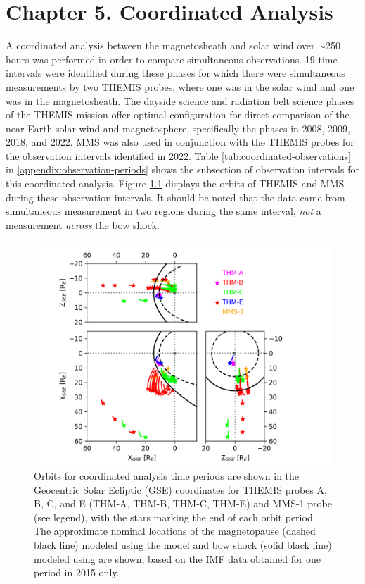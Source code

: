 \chapter{Chapter 5. Coordinated Analysis}
A coordinated analysis between the magnetosheath and solar wind over $\sim$250 hours was performed in order to compare simultaneous observations. 19 time intervals were identified during these phases for which there were simultaneous measurements by two THEMIS probes, where one was in the solar wind and one was in the magnetosheath. The dayside science and radiation belt science phases of the THEMIS mission offer optimal configuration for direct comparison of the near-Earth solar wind and magnetosphere, specifically the phases in 2008, 2009, 2018, and 2022. MMS was also used in conjunction with the THEMIS probes for the observation intervals identified in 2022. Table \ref{tab:coordinated-observations} in \ref{appendix:observation-periods} shows the subsection of observation intervals for this coordinated analysis. Figure \ref{fig:coordinated-orbits-plot} displays the orbits of THEMIS and MMS during these observation intervals. It should be noted that the data came from simultaneous measurement in two regions during the same interval, \textit{not} a measurement \textit{across} the bow shock.

\begin{figure}
    \centering
    \includegraphics[width=\textwidth]{Figures/Orbits/all_TE_orbits_xy_xz_yz_coordinated.png}
    \caption[Orbits for coordinated observation intervalss]{Orbits for coordinated analysis time periods are shown in the Geocentric Solar Ecliptic (GSE) coordinates for THEMIS probes A, B, C, and E (THM-A, THM-B, THM-C, THM-E) and MMS-1 probe (see legend), with the stars marking the end of each orbit period. The approximate nominal locations of the magnetopause (dashed black line) modeled using the \cite{Shue:1997} model and bow shock (solid black line) modeled using \cite{SlavinHolzer:1984} are shown, based on the IMF data obtained for one period in 2015 only.}
    \label{fig:coordinated-orbits-plot}
\end{figure}

